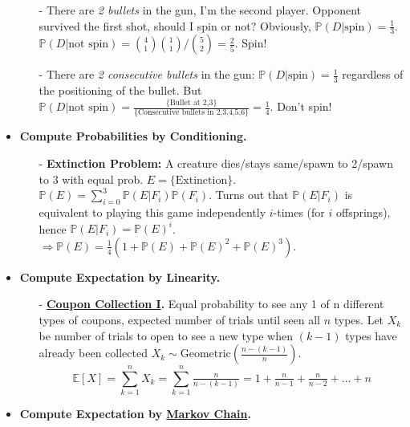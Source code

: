 \documentclass[9pt, landscape]{article}
\begin{document}
\begin{multicols*}{3}
\begin{itemize}
\begin{itemize}[leftmargin=10pt,noitemsep,topsep=0pt,partopsep=0pt]
		\item[-] There are \textit{2 bullets} in the gun, I'm the second player. Opponent survived the first shot, should I spin or not? Obviously, $\mathbb{P}\left(D|\text{spin}\right) = \frac{1}{3}$. $\mathbb{P}\left(D|\text{not spin}\right) = \binom{4}{1} \binom{1}{1} \Big/ \binom{5}{2} = \frac{2}{5}$. Spin!
		\item[-] There are \textit{2 consecutive bullets} in the gun: $\mathbb{P}\left(D|\text{spin}\right) = \frac{1}{3}$ regardless of the positioning of the bullet. But $\mathbb{P}\left(D|\text{not spin}\right) = \frac{\{\text{Bullet at 2,3}\}}{\{\text{Consecutive bullets in 2,3,4,5,6}\}} = \frac{1}{4}$. Don't spin!
	\end{itemize}
	\item \textbf{Compute Probabilities by Conditioning.} 
	\begin{itemize}[leftmargin=10pt,noitemsep,topsep=0pt,partopsep=0pt]
		\item[-] \textbf{Extinction Problem:} A creature dies/stays same/spawn to 2/spawn to 3 with equal prob. $E = \{\text{Extinction}\}$. $\mathbb{P}\left(E\right) = \sum_{i=0}^3 \mathbb{P}\left(E | F_i\right) \mathbb{P}\left(F_i\right)$. Turns out that $\mathbb{P}\left(E|F_i\right)$ is equivalent to playing this game independently $i$-times (for $i$ offsprings), hence $\mathbb{P}\left(E|F_i\right) = \mathbb{P}\left(E\right)^i$. $\Rightarrow \mathbb{P}\left(E\right) = \frac{1}{4}(1+\mathbb{P}\left(E\right)+\mathbb{P}\left(E\right)^2 + \mathbb{P}\left(E\right)^3)$.
	\end{itemize}
	\item \textbf{Compute Expectation by Linearity.}
	\begin{itemize}[leftmargin=10pt,noitemsep,topsep=0pt,partopsep=0pt]
		\item[-] \textbf{\href{https://en.wikipedia.org/wiki/Coupon_collector's_problem}{Coupon Collection I}.} Equal probability to see any 1 of n different types of coupons, expected number of trials until seen all $n$ types. Let $X_k$ be number of trials to open to see a new type when $(k-1)$ types have already been collected $X_k\sim \text{Geometric}(\frac{n-(k-1)}{n})$. 
		{$$
		\mathbb{E}\left[X\right] = \sum_{k=1}^{n} X_k = \sum_{k=1}^n \tfrac{n}{n-(k-1)} = 1+\tfrac{n}{n-1}+\tfrac{n}{n-2} + ... + n
		$$}
	\end{itemize}
	\item \textbf{Compute Expectation by \href{https://en.wikipedia.org/wiki/Markov_chain}{Markov Chain}.} 
	\begin{itemize}[leftmargin=10pt,noitemsep,topsep=0pt,partopsep=0pt]

\end{itemize}
\end{itemize}
\end{multicols*}
\end{document}
